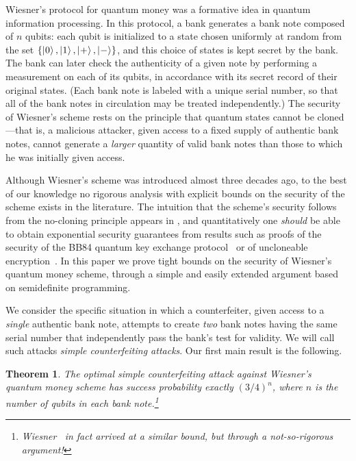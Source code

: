 \documentclass[11pt,letterpaper]{article}
\newtheorem{theorem}{Theorem}
\theoremstyle{definition}
\newcommand{\microspace}{\mspace{0.5mu}}
\def \lket {\left|}
\def \rket {\right\rangle}
\newcommand{\ket}[1]{\lket\microspace #1 \microspace\rket}
\begin{document}
Wiesner's protocol for quantum money \cite{Wiesner83} 
was a formative idea
in quantum information processing.
In this protocol, a bank generates a bank note composed of $n$
qubits: each qubit is initialized to a state chosen uniformly at
random from the set $\{ \ket{0}, \ket{1}, \ket{+}, \ket{-}\}$, and
this choice of states is kept secret by the bank.
The bank can later check the authenticity of a given note by
performing a measurement on each of its qubits, in accordance with its
secret record of their original states.
(Each bank note is labeled with a unique serial number, so that all of
the bank notes in circulation may be treated independently.)
The security of Wiesner's scheme rests on the principle that quantum
states cannot be cloned---that is, a malicious attacker, given access
to a fixed supply of authentic bank notes, cannot generate a
\emph{larger} quantity of valid bank notes than those to which he was
initially given access.

Although Wiesner's scheme was introduced almost three decades ago, to
the best of our knowledge no rigorous analysis with explicit
bounds on the security of the scheme exists in the literature.
The intuition that the scheme's security follows from the no-cloning
principle appears in \cite{LoSP98}, and quantitatively one \emph{should}
be able to obtain exponential security guarantees from results
such as proofs of the security of the BB84 quantum key exchange
protocol~\cite{BennettB84,ShorP00,May01} or of
uncloneable encryption~\cite{Gott02}.
In this paper we prove tight bounds on the security of Wiesner's
quantum money scheme, through a simple and easily extended argument
based on semidefinite programming.

We consider the specific situation in which a counterfeiter, given
access to a \emph{single} authentic bank note, attempts to create
\emph{two} bank notes having the same serial number that independently
pass the bank's test for validity.
We will call such attacks \emph{simple counterfeiting attacks}. 
Our first main result is the following. 

\begin{theorem}\label{thm:main-quant}
  The optimal simple counterfeiting attack against
  Wiesner's quantum money scheme has success probability exactly
  $(3/4)^n$, where $n$ is the number of qubits in each bank
  note.\footnote{%
    Wiesner~\cite{Wiesner83} in fact arrived at a similar bound, but
    through a not-so-rigorous argument!}
\end{theorem}
\end{document}
